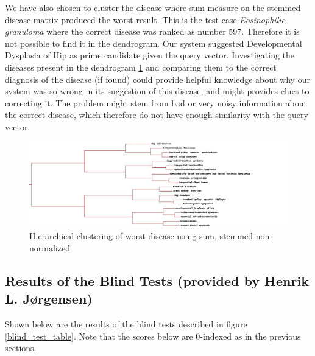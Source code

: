 We have also chosen to cluster the disease where sum measure on the
stemmed disease matrix produced the worst result. This is the test
case \textit{Eosinophilic granuloma} where the correct disease was
ranked as number 597. Therefore it is not possible to find it in the
dendrogram. Our system suggested Developmental Dysplasia of Hip as
prime candidate given the query vector. Investigating the diseases
present in the dendrogram
\ref{sum_stem_top20_worst_developmental_dysplasia_of_hip} and
comparing them to the correct diagnosis of the disease (if found)
could provide helpful knowledge about why our system was so wrong in
its suggestion of this disease, and might provides clues to correcting
it. The problem might stem from bad or very noisy information about
the correct disease, which therefore do not have enough similarity
with the query vector.

\begin{figure}[H]
  \begin{center}
    \includegraphics[width=1.3\textwidth]{clusters/sum_stem_top20_worst_developmental_dysplasia_of_hip.jpg}
  \end{center}
  \caption{Hierarchical clustering of worst disease using sum, stemmed non-normalized}
  \label{sum_stem_top20_worst_developmental_dysplasia_of_hip}
\end{figure}

\subsection{Results of the Blind Tests (provided by Henrik L. J\o rgensen)\label{Blindtest}}

Shown below are the results of the blind tests described in figure \ref{blind_test_table}.
Note that the scores below are 0-indexed as in the previous sections.

